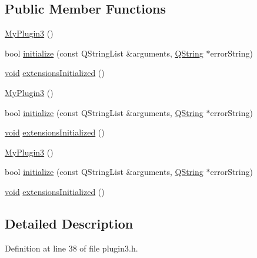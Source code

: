 \subsection*{\-Public \-Member \-Functions}
\begin{DoxyCompactItemize}
\item 
\hyperlink{class_plugin3_1_1_my_plugin3_a212ca8165573e34ff18cdc6de824d8a9}{\-My\-Plugin3} ()
\item 
bool \hyperlink{class_plugin3_1_1_my_plugin3_adccf646390950e6541ccc0a626c49394}{initialize} (const \-Q\-String\-List \&arguments, \hyperlink{group___u_a_v_objects_plugin_gab9d252f49c333c94a72f97ce3105a32d}{\-Q\-String} $\ast$error\-String)
\item 
\hyperlink{group___u_a_v_objects_plugin_ga444cf2ff3f0ecbe028adce838d373f5c}{void} \hyperlink{class_plugin3_1_1_my_plugin3_a23ad78659a9ca692f5fcdeebaa5a6ffb}{extensions\-Initialized} ()
\item 
\hyperlink{class_plugin3_1_1_my_plugin3_a62a15a56cf2c5d5fc69dc58d340adce4}{\-My\-Plugin3} ()
\item 
bool \hyperlink{class_plugin3_1_1_my_plugin3_a0cb093f6917e25c3f7df1578a2620ef9}{initialize} (const \-Q\-String\-List \&arguments, \hyperlink{group___u_a_v_objects_plugin_gab9d252f49c333c94a72f97ce3105a32d}{\-Q\-String} $\ast$error\-String)
\item 
\hyperlink{group___u_a_v_objects_plugin_ga444cf2ff3f0ecbe028adce838d373f5c}{void} \hyperlink{class_plugin3_1_1_my_plugin3_a44cb56ba99bb1aadd5f6d30825dd6f5a}{extensions\-Initialized} ()
\item 
\hyperlink{class_plugin3_1_1_my_plugin3_a62a15a56cf2c5d5fc69dc58d340adce4}{\-My\-Plugin3} ()
\item 
bool \hyperlink{class_plugin3_1_1_my_plugin3_a0cb093f6917e25c3f7df1578a2620ef9}{initialize} (const \-Q\-String\-List \&arguments, \hyperlink{group___u_a_v_objects_plugin_gab9d252f49c333c94a72f97ce3105a32d}{\-Q\-String} $\ast$error\-String)
\item 
\hyperlink{group___u_a_v_objects_plugin_ga444cf2ff3f0ecbe028adce838d373f5c}{void} \hyperlink{class_plugin3_1_1_my_plugin3_a44cb56ba99bb1aadd5f6d30825dd6f5a}{extensions\-Initialized} ()
\end{DoxyCompactItemize}


\subsection{\-Detailed \-Description}


\-Definition at line 38 of file plugin3.\-h.



